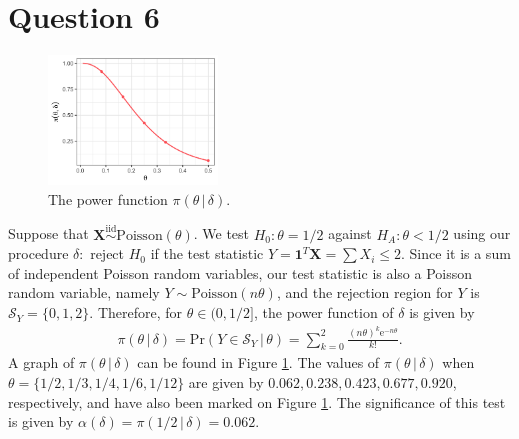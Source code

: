 \documentclass[10pt]{article}
\begin{document}
\section{Question 6} \noindent
\begin{figure}
    \centering
    \includegraphics[width = 0.4\textwidth]{img/q06-power-function.png}
    \caption{The power function \(\pi(\theta \,|\, \delta)\).}
    \label{q06-power-function}
\end{figure}
Suppose that \(\bm{X} \overset{\mathrm{iid}}{\sim} \mathrm{Poisson}( \theta)\). We test \(H_0 : \theta = 1/2\) against \(H_A : \theta < 1/2\) using 
our procedure \(\delta :\) reject \(H_0\) if the test statistic \(Y = \mathbf{1}^T \bm{X} = \sum X_i \le 2\). Since it is a sum of independent Poisson random 
variables, our test statistic is also a Poisson random variable, namely \(Y \sim \mathrm{Poisson}(n \theta)\), and the rejection region for \(Y\) is 
\(\mathcal{S}_Y = \{0,1,2\}\). Therefore, for \(\theta \in (0,1/2]\), the power function of \(\delta\) is given by 
\begin{align*}
    \pi(\theta \,|\, \delta)
    = \mathrm{Pr}(Y \in \mathcal{S}_Y \,|\, \theta)
    = \sum_{k=0}^2 \frac{(n\theta)^k \mathrm{e}^{-n\theta}}{k!}.
\end{align*}
A graph of \(\pi(\theta\,|\,\delta)\) can be found in Figure \ref{q06-power-function}.
The values of \(\pi(\theta\,|\,\delta)\) when \(\theta = \{1/2,1/3,1/4,1/6,1/12\}\) are given by 
\(0.062, 0.238, 0.423, 0.677, 0.920\), respectively, and have also been marked on Figure \ref{q06-power-function}.
The significance of this test is given by \(\alpha(\delta) = \pi(1/2 \,|\, \delta) = 0.062\).

\end{document}
